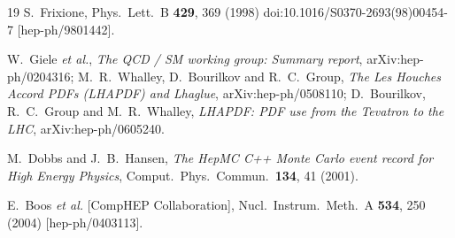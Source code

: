 \documentclass[12pt]{book}
\begin{document}
\begin{thebibliography}{19}
  S.~Frixione,
  Phys.\ Lett.\ B {\bf 429}, 369 (1998)
  doi:10.1016/S0370-2693(98)00454-7
  [hep-ph/9801442].

  W.~Giele {\it et al.},
  {\em The QCD / SM working group: Summary report},
  arXiv:hep-ph/0204316;
  M.~R.~Whalley, D.~Bourilkov and R.~C.~Group,
  {\em The Les Houches Accord PDFs (LHAPDF) and Lhaglue},
  arXiv:hep-ph/0508110;
  D.~Bourilkov, R.~C.~Group and M.~R.~Whalley,
  {\em LHAPDF: PDF use from the Tevatron to the LHC},
  arXiv:hep-ph/0605240.

  M.~Dobbs and J.~B.~Hansen,
  {\em The HepMC C++ Monte Carlo event record for High Energy
    Physics},
  Comput.\ Phys.\ Commun.\  {\bf 134}, 41 (2001).

  E.~Boos {\it et al.}  [CompHEP Collaboration],
  Nucl.\ Instrum.\ Meth.\ A {\bf 534}, 250 (2004)
  [hep-ph/0403113].


\end{thebibliography}
\end{document}
